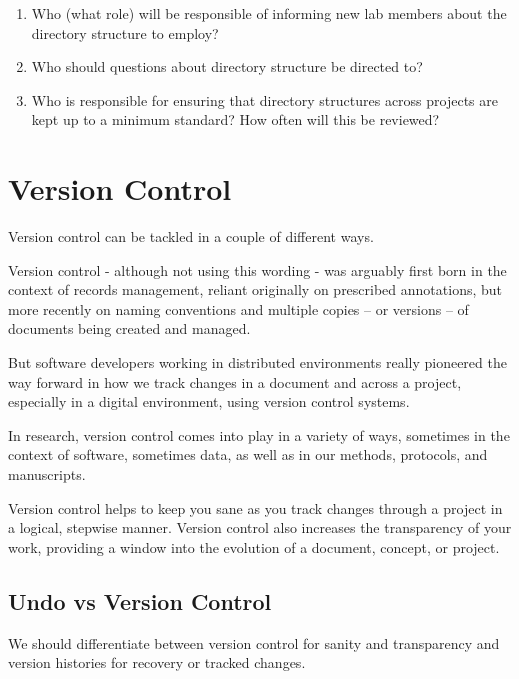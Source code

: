 \documentclass[
]{book}
\providecommand{\tightlist}{%
  \setlength{\itemsep}{0pt}\setlength{\parskip}{0pt}}
\begin{document}
\begin{enumerate}
\def\labelenumi{\arabic{enumi}.}
\setcounter{enumi}{1}
\tightlist
\item
  Who (what role) will be responsible of informing new lab members about the directory structure to employ?
\item
  Who should questions about directory structure be directed to?
\item
  Who is responsible for ensuring that directory structures across projects are kept up to a minimum standard? How often will this be reviewed?
\end{enumerate}

\hypertarget{version-control-1}{%
\chapter*{Version Control}\label{version-control-1}}

Version control can be tackled in a couple of different ways.

Version control - although not using this wording - was arguably first born in the context of records management, reliant originally on prescribed annotations, but more recently on naming conventions and multiple copies -- or versions -- of documents being created and managed.

But software developers working in distributed environments really pioneered the way forward in how we track changes in a document and across a project, especially in a digital environment, using version control systems.

In research, version control comes into play in a variety of ways, sometimes in the context of software, sometimes data, as well as in our methods, protocols, and manuscripts.

Version control helps to keep you sane as you track changes through a project in a logical, stepwise manner. Version control also increases the transparency of your work, providing a window into the evolution of a document, concept, or project.

\hypertarget{undo-vs-version-control}{%
\section*{Undo vs Version Control}\label{undo-vs-version-control}}

We should differentiate between version control for sanity and transparency and version histories for recovery or tracked changes.
\end{document}
